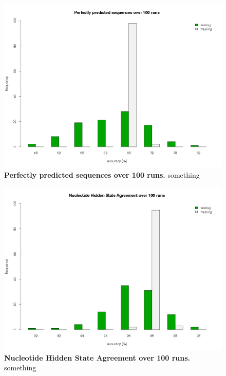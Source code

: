 \begin{figure}[ht]
	\begin{center}
		\includegraphics[scale=0.42]{pics/perfect2.png}
	\caption[Perfectly predicted sequences over 100 runs]{
	\textbf{Perfectly predicted sequences over 100 runs.}
	something}
	\end{center}
	\label{fig:perfect2}
\end{figure}

\begin{figure}[ht]
	\begin{center}
		\includegraphics[scale=0.42]{pics/agree2.png}
	\caption[Nucleotide Hidden State Agreement over 100 runs]{
	\textbf{Nucleotide Hidden State Agreement over 100 runs.}
	something}
	\end{center}
	\label{fig:agree2}
\end{figure}

